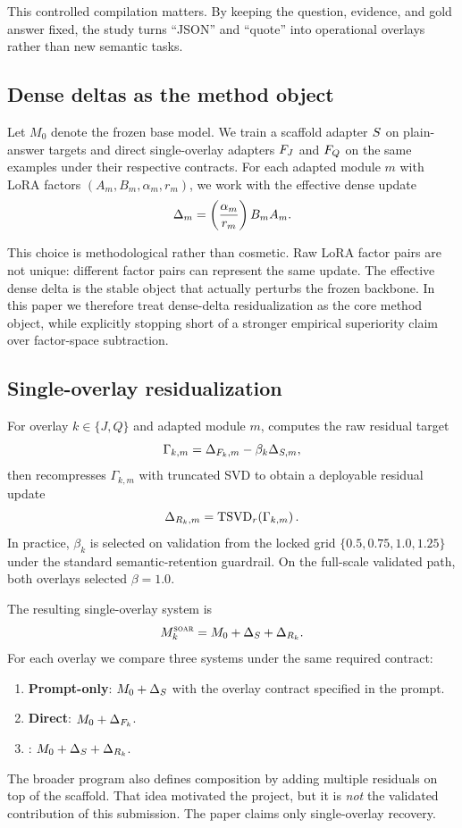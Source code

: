 This controlled compilation matters. By keeping the question, evidence, and gold answer fixed, the study turns ``JSON'' and ``quote'' into operational overlays rather than new semantic tasks.

\subsection{Dense deltas as the method object}

Let $M_0$ denote the frozen base model. We train a scaffold adapter $S$ on plain-answer targets and direct single-overlay adapters $F_{J}$ and $F_{Q}$ on the same examples under their respective contracts. For each adapted module $m$ with LoRA factors $(A_m, B_m, \alpha_m, r_m)$, we work with the effective dense update
\begin{equation}
\Delta_{m} = \left(\frac{\alpha_m}{r_m}\right) B_m A_m.
\end{equation}

This choice is methodological rather than cosmetic. Raw LoRA factor pairs are not unique: different factor pairs can represent the same update. The effective dense delta is the stable object that actually perturbs the frozen backbone. In this paper we therefore treat dense-delta residualization as the core method object, while explicitly stopping short of a stronger empirical superiority claim over factor-space subtraction.

\subsection{Single-overlay residualization}

For overlay $k \in \{J,Q\}$ and adapted module $m$, \method{} computes the raw residual target
\begin{equation}
\Gamma_{k,m} = \Delta_{F_k,m} - \beta_k \Delta_{S,m},
\end{equation}
then recompresses $\Gamma_{k,m}$ with truncated SVD to obtain a deployable residual update
\begin{equation}
\Delta_{R_k,m} = \mathrm{TSVD}_r\!\left(\Gamma_{k,m}\right).
\end{equation}
In practice, $\beta_k$ is selected on validation from the locked grid $\{0.5, 0.75, 1.0, 1.25\}$ under the standard semantic-retention guardrail. On the full-scale validated path, both overlays selected $\beta = 1.0$.

The resulting single-overlay system is
\begin{equation}
M_k^{\textsc{soar}} = M_0 + \Delta_{S} + \Delta_{R_k}.
\end{equation}
For each overlay we compare three systems under the same required contract:
\begin{enumerate}[leftmargin=1.5em]
    \item \textbf{Prompt-only}: $M_0 + \Delta_{S}$ with the overlay contract specified in the prompt.
    \item \textbf{Direct}: $M_0 + \Delta_{F_k}$.
    \item \textbf{\method{}}: $M_0 + \Delta_{S} + \Delta_{R_k}$.
\end{enumerate}

The broader \method{} program also defines composition by adding multiple residuals on top of the scaffold. That idea motivated the project, but it is \emph{not} the validated contribution of this submission. The paper claims only single-overlay recovery.
